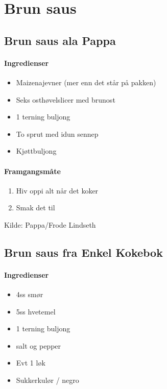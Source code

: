 \section{Brun saus}


\subsection{Brun saus ala Pappa}

\paragraph{Ingredienser}
\begin{itemize}[noitemsep]
	\item Maizenajevner (mer enn det står på pakken)
	\item Seks osthøvelslicer med brunost
	\item 1 terning buljong
	\item To sprut med idun sennep
	\item Kjøttbuljong
\end{itemize}


\paragraph{Framgangsmåte}
\begin{enumerate}[noitemsep]
	\item Hiv oppi alt når det koker
	\item Smak det til
\end{enumerate}

Kilde: Pappa/Frode Lindseth


\subsection{Brun saus fra Enkel Kokebok}
\paragraph{Ingredienser}
\begin{itemize}[noitemsep]
	\item 4ss smør
	\item 5ss hvetemel
	\item 1 terning buljong
	\item salt og pepper
	\item Evt 1 løk
	\item Sukkerkulør / negro
\end{itemize}


